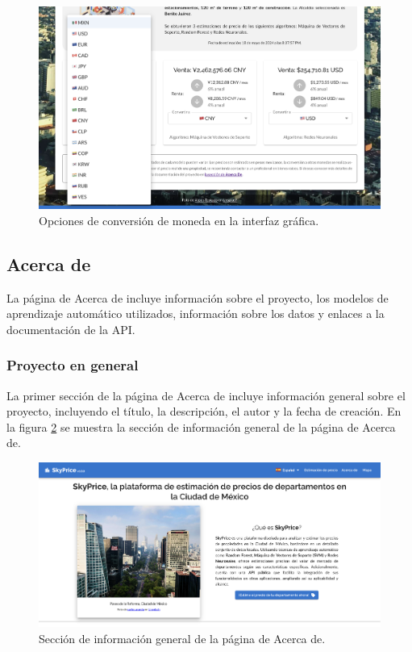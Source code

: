 \begin{figure}[H]
    \centering
    \includegraphics[width=1.0\textwidth]{imagenes/05-implementacion/interfaz-grafica/conversor-moneda.png}
    \caption{Opciones de conversión de moneda en la interfaz gráfica.}
    \label{fig:conversor-moneda}
\end{figure}

\subsection{Acerca de}
La página de Acerca de incluye información sobre el proyecto, los modelos de
aprendizaje automático utilizados, información sobre los datos y enlaces a la
documentación de la API.

\subsubsection{Proyecto en general}
La primer sección de la página de Acerca de incluye información general sobre el
proyecto, incluyendo el título, la descripción, el autor y la fecha de creación. En
la figura \ref{fig:acerca-de-proyecto} se muestra la sección de información general
de la página de Acerca de.

\begin{figure}[H]
    \centering
    \includegraphics[width=1.0\textwidth]{imagenes/05-implementacion/interfaz-grafica/acerca-de-proyecto.png}
    \caption{Sección de información general de la página de Acerca de.}
    \label{fig:acerca-de-proyecto}
\end{figure}

